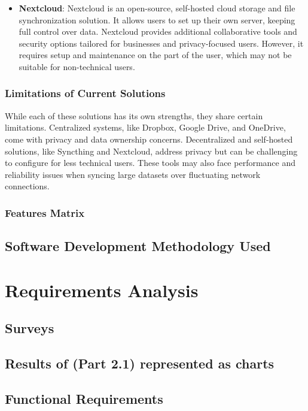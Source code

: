 \documentclass{article}
\begin{document}
\begin{itemize}
      \item \textbf{Nextcloud}: Nextcloud is an open-source, self-hosted cloud storage and file synchronization solution. It allows users to set up their own server, keeping full control over data. Nextcloud provides additional collaborative tools and security options tailored for businesses and privacy-focused users. However, it requires setup and maintenance on the part of the user, which may not be suitable for non-technical users.
  \end{itemize}

      \subsubsection{Limitations of Current Solutions}
      {
        While each of these solutions has its own strengths, they share certain limitations. Centralized systems, like Dropbox, Google Drive, and OneDrive, come with privacy and data ownership concerns. Decentralized and self-hosted solutions, like Syncthing and Nextcloud, address privacy but can be challenging to configure for less technical users. These tools may also face performance and reliability issues when syncing large datasets over fluctuating network connections.
      }
      \subsubsection{Features Matrix}
			
		\subsection{Software Development Methodology Used}
    	 
	\section{Requirements Analysis}
		\subsection{Surveys}
		
		\subsection{Results of (Part 2.1) represented as charts}
		
		\subsection{Functional Requirements}
		
\end{document}
